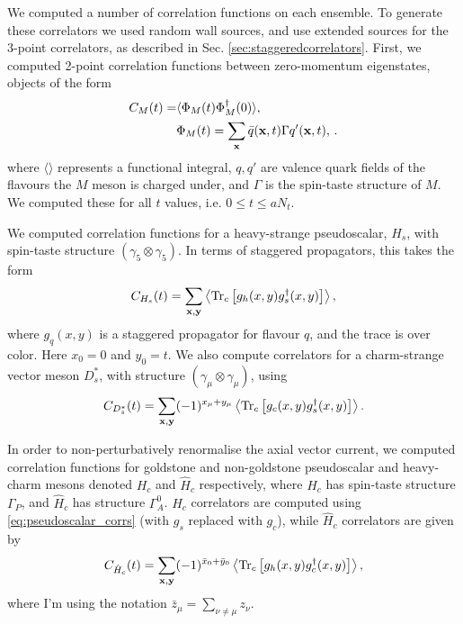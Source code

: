 We computed a number of correlation functions on each ensemble. To generate these correlators we used random wall sources, and use extended sources for the 3-point correlators, as described in Sec. \ref{sec:staggeredcorrelators}. First, we computed 2-point correlation functions between zero-momentum eigenstates, objects of the form
\begin{align}
  C_{M}(t) =& \langle \Phi_M (t) \Phi_M^{\dagger}(0) \rangle, \\ 
  &\Phi_M(t) = \sum_{{\bf{x}}} \bar{q}({\bf{x}},t) \Gamma q'({\bf{x}},t), \nonumber\,.
\end{align}
where $\langle \rangle$ represents a functional integral, $q,q'$ are valence quark fields of the flavours the $M$ meson is charged under, and $\Gamma$ is the spin-taste structure of $M$. We computed these for all $t$ values, i.e. $0\leq t \leq aN_t$. 

We computed correlation functions for a heavy-strange pseudoscalar, $H_s$, with spin-taste structure $(\gamma_5\otimes \gamma_5)$. In terms of staggered propagators, this takes the form
\begin{align}
  C_{H_s}(t) = \sum_{\bf{x},\bf{y}} \left\langle \text{Tr}_c\left[ g_h(x,y) g_s^{\dagger}(x,y) \right] \right\rangle,
  \label{eq:pseudoscalar_corrs}
\end{align}
where $g_q(x,y)$ is a staggered propagator for flavour $q$, and the trace is over color. Here $x_0=0$ and $y_0=t$. We also compute correlators for a charm-strange vector meson $D_s^*$, with structure $(\gamma_{\mu}\otimes \gamma_{\mu})$, using
\begin{align}
  C_{D_s^*}(t) = \sum_{\bf{x},\bf{y}} (-1)^{x_{\mu}+y_{\mu}} \left\langle \text{Tr}_c\left[ g_c(x,y) g_s^{\dagger}(x,y) \right] \right\rangle.
\end{align}

In order to non-perturbatively renormalise the axial vector current, we computed correlation functions for goldstone and non-goldstone pseudoscalar and heavy-charm mesons denoted $H_c$ and $\hat{H}_c$ respectively, where $H_c$ has spin-taste structure $\Gamma_P$, and $\hat{H}_c$ has structure $\Gamma^0_A$. $H_c$ correlators are computed using \eqref{eq:pseudoscalar_corrs} (with $g_s$ replaced with $g_c$), while $\hat{H}_c$ correlators are given by
\begin{align}
  C_{\hat{H}_c}(t) = \sum_{\bf{x},\bf{y}}(-1)^{\bar{x}_0+\bar{y}_0} \left\langle \text{Tr}_c\left[ g_h(x,y) g^{\dagger}_c(x,y) \right] \right\rangle,
\end{align}
where I'm using the notation $\bar{z}_{\mu} = \sum_{\nu\neq\mu} z_{\nu}$.


